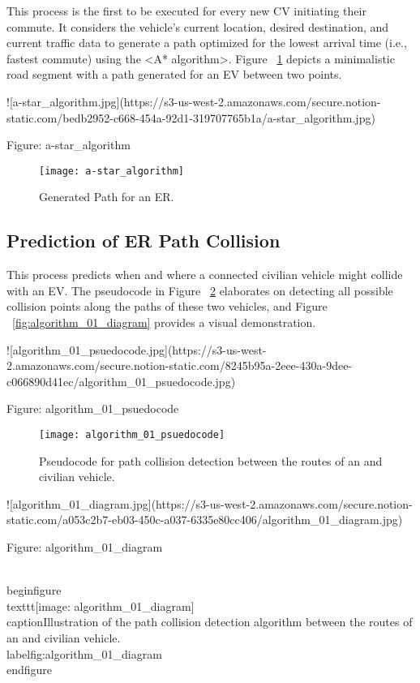 This process is the first to be executed for every new CV initiating their commute. It considers the vehicle's current location, desired destination, and current traffic data to generate a path optimized for the lowest arrival time (i.e., fastest commute) using the <A* algorithm>. Figure ~\ref{fig:a-star_algorithm} depicts a minimalistic road segment with a path generated for an \acrshort{EV} between two points.

![a-star_algorithm.jpg](https://s3-us-west-2.amazonaws.com/secure.notion-static.com/bedb2952-c668-454a-92d1-319707765b1a/a-star_algorithm.jpg)

Figure: a-star_algorithm

\begin{figure}
\texttt{[image: a-star\_algorithm]}
\caption{Generated Path for an ER.}
\label{fig:a-star_algorithm}
\end{figure}

\subsection{Prediction of ER Path Collision}

This process predicts when and where a connected civilian vehicle might collide with an \acrshort{EV}. The pseudocode in Figure ~\ref{fig:algorithm_01_psuedocode} elaborates on detecting all possible collision points along the paths of these two vehicles, and Figure ~\ref{fig:algorithm_01_diagram} provides a visual demonstration.

![algorithm_01_psuedocode.jpg](https://s3-us-west-2.amazonaws.com/secure.notion-static.com/8245b95a-2eee-430a-9dee-c066890d41ec/algorithm_01_psuedocode.jpg)

Figure: algorithm_01_psuedocode

\begin{figure}
\texttt{[image: algorithm\_01\_psuedocode]}
\caption{Pseudocode for path collision detection between the routes of an  and civilian vehicle.}
\label{fig:algorithm_01_psuedocode}
\end{figure}

![algorithm_01_diagram.jpg](https://s3-us-west-2.amazonaws.com/secure.notion-static.com/a053c2b7-eb03-450c-a037-6335e80cc406/algorithm_01_diagram.jpg)

Figure: algorithm_01_diagram

\\begin{figure}
\\texttt{[image: algorithm\_01\_diagram]}
\\caption{Illustration of the path collision detection algorithm between the routes of an  and civilian vehicle.}
\\label{fig:algorithm_01_diagram}
\\end{figure}

